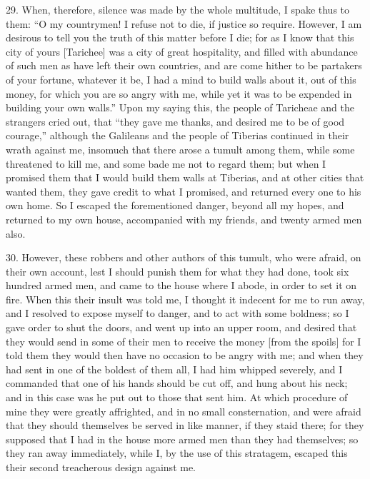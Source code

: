 29. When, therefore, silence was made by the whole multitude, I spake thus
to them: ``O my countrymen! I refuse not to die, if justice so require.
However, I am desirous to tell you the truth of this matter before I die;
for as I know that this city of yours [Tarichee] was a city of great
hospitality, and filled with abundance of such men as have left their own
countries, and are come hither to be partakers of your fortune, whatever
it be, I had a mind to build walls about it, out of this money, for which
you are so angry with me, while yet it was to be expended in building your
own walls.'' Upon my saying this, the people of Taricheae and the strangers
cried out, that ``they gave me thanks, and desired me to be of good
courage,'' although the Galileans and the people of Tiberias continued in
their wrath against me, insomuch that there arose a tumult among them,
while some threatened to kill me, and some bade me not to regard them; but
when I promised them that I would build them walls at Tiberias, and at
other cities that wanted them, they gave credit to what I promised, and
returned every one to his own home. So I escaped the forementioned danger,
beyond all my hopes, and returned to my own house, accompanied with my
friends, and twenty armed men also.

30. However, these robbers and other authors of this tumult, who were
afraid, on their own account, lest I should punish them for what they had
done, took six hundred armed men, and came to the house where I abode, in
order to set it on fire. When this their insult was told me, I thought it
indecent for me to run away, and I resolved to expose myself to danger,
and to act with some boldness; so I gave order to shut the doors, and went
up into an upper room, and desired that they would send in some of their
men to receive the money [from the spoils] for I told them they would then
have no occasion to be angry with me; and when they had sent in one of the
boldest of them all, I had him whipped severely, and I commanded that one
of his hands should be cut off, and hung about his neck; and in this case
was he put out to those that sent him. At which procedure of mine they
were greatly affrighted, and in no small consternation, and were afraid
that they should themselves be served in like manner, if they staid there;
for they supposed that I had in the house more armed men than they had
themselves; so they ran away immediately, while I, by the use of this
stratagem, escaped this their second treacherous design against me.

